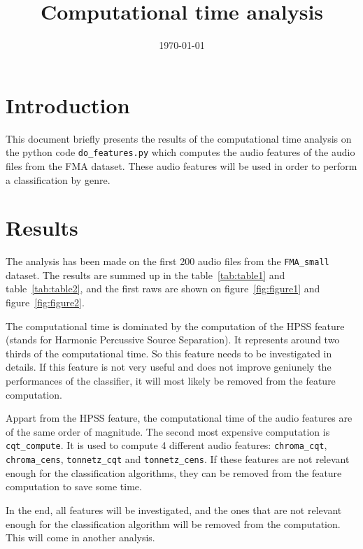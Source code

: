 \documentclass[11pt]{article}
\title{Computational time analysis}
\author{}
\date{\today}
\begin{document}
\maketitle

\section{Introduction}

This document briefly presents the results of the computational time analysis on the python code \texttt{do\_features.py} which computes the audio features of the audio files from the FMA dataset. These audio features will be used in order to perform a classification by genre.

\section{Results}

The analysis has been made on the first 200 audio files from the \texttt{FMA\_small} dataset. The results are summed up in the table~\ref{tab:table1} and table~\ref{tab:table2}, and the first raws are shown on figure~\ref{fig:figure1} and figure~\ref{fig:figure2}.

The computational time is dominated by the computation of the HPSS feature (stands for Harmonic Percussive Source Separation). It represents around two thirds of the computational time. So this feature needs to be investigated in details. If this feature is not very useful and does not improve geniunely the performances of the classifier, it will most likely be removed from the feature computation.

Appart from the HPSS feature, the computational time of the audio features are of the same order of magnitude. The second most expensive computation is \texttt{cqt\_compute}. It is used to compute 4 different audio features: \texttt{chroma\_cqt}, \texttt{chroma\_cens}, \texttt{tonnetz\_cqt} and \texttt{tonnetz\_cens}. If these features are not relevant enough for the classification algorithms, they can be removed from the feature computation to save some time.

In the end, all features will be investigated, and the ones that are not relevant enough for the classification algorithm will be removed from the computation. This will come in another analysis.
\end{document}
